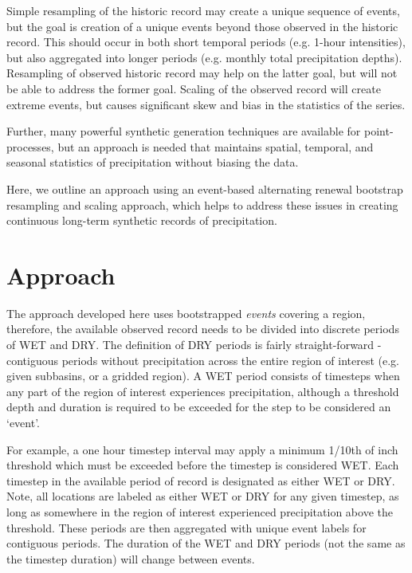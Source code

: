 \documentclass[11pt]{article} %
\begin{document}
Simple resampling of the historic record may create a unique sequence of events, but the goal is creation of a unique events beyond those observed in the historic record. This should occur in both short temporal periods (e.g. 1-hour intensities), but also aggregated into longer periods (e.g. monthly total precipitation depths). Resampling of observed historic record may help on the latter goal, but will not be able to address the former goal. Scaling of the observed record will create extreme events, but causes significant skew and bias in the statistics of the series.

Further, many powerful synthetic generation techniques are available for point-processes, but an approach is needed that maintains spatial, temporal, and seasonal statistics of precipitation without biasing the data.

Here, we outline an approach using an event-based alternating renewal bootstrap resampling and scaling approach, which helps to address these issues in creating continuous long-term synthetic records of precipitation.

\section{Approach}

The approach developed here uses bootstrapped \textit{events} covering a region, therefore, the available observed record needs to be divided into discrete periods of WET and DRY. The definition of DRY periods is fairly straight-forward - contiguous periods without precipitation across the entire region of interest (e.g. given subbasins, or a gridded region). A WET period consists of timesteps when any part of the region of interest experiences precipitation, although a threshold depth and duration is required to be exceeded for the step to be considered an ‘event’.

For example, a one hour timestep interval may apply a minimum 1/10th of inch threshold which must be exceeded before the timestep is considered WET. Each timestep in the available period of record is designated as either WET or DRY. Note, all locations are labeled as either WET or DRY for any given timestep, as long as somewhere in the region of interest experienced precipitation above the threshold. These periods are then aggregated with unique event labels for contiguous periods. The duration of the WET and DRY periods (not the same as the timestep duration) will change between events. 
\end{document}
